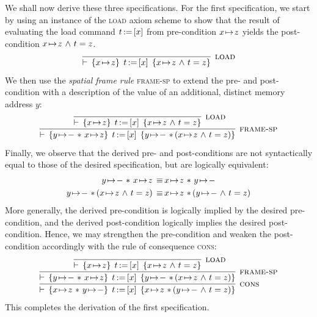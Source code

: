 \documentclass[11pt]{report}         %
\begin{document}

We shall now derive these three specifications. For the first specification, we start by using an instance of the \textsc{load} axiom scheme to show that the result of evaluating the load command $t \operatorname{:\!=} \left[ x \right]$ from pre-condition $x \!\mapsto\! z$ yields the post-condition $x \!\mapsto\! z \operatorname{\,\wedge\,} t = z$.
\[ 
  \infer[\textsc{load}]{\triple{x \fpointsto z}{\cload{t}{x}}{x \fpointsto z \conj t = z}}{}
\] We then use the \emph{spatial frame rule} \textsc{frame-sp} to extend the pre- and post-condition with a description of the value of an additional, distinct memory address $y$: \[ 
  \infer[\textsc{frame-sp}]{\triple{y \fpointsto - \fsep x \fpointsto z}{\cload{t}{x}}{y \fpointsto - \fsep (x \fpointsto z \conj t = z)}}{
    \infer[\textsc{load}]{\triple{x \fpointsto z}{\cload{t}{x}}{x \fpointsto z \conj t = z}}{}
  }
\] Finally, we observe that the derived pre- and post-conditions are not syntactically equal to those of the desired specification, but are logically equivalent: \begin{align*}
y \fpointsto - \fsep x \fpointsto z \sequiv & x \fpointsto z \fsep y \fpointsto - \\ 
y \fpointsto - \fsep (x \fpointsto z \conj t = z) \sequiv & x \fpointsto z \fsep (y \fpointsto - \conj t = z)
\end{align*} More generally, the derived pre-condition is logically implied by the desired pre-condition, and the derived post-condition logically implies the desired post-condition. Hence, we may strengthen the pre-condition and weaken the post-condition accordingly with the rule of consequence \textsc{cons}: \[ 
  \infer[\textsc{cons}]{\triple{x \fpointsto z \fsep y \fpointsto -}{\cload{t}{x}}{x \fpointsto z \fsep (y \fpointsto - \conj t = z)}}{
    \infer[\textsc{frame-sp}]{\triple{y \fpointsto - \fsep x \fpointsto z}{\cload{t}{x}}{y \fpointsto - \fsep (x \fpointsto z \conj t = z)}}{
      \infer[\textsc{load}]{\triple{x \fpointsto z}{\cload{t}{x}}{x \fpointsto z \conj t = z}}{}
    }
  }
\] This completes the derivation of the first specification. 
\end{document}
